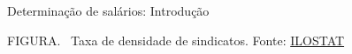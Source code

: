 \documentclass[10pt]{beamer}
\begin{document}
\begin{frame}{Determinação de salários: Introdução}
    \begin{center}
		\begin{minipage}[b]{.55\textwidth}
			\tiny{{\scshape FIGURA}. \ Taxa de densidade de sindicatos. Fonte: \href{https://ilostat.ilo.org/topics/union-membership/}{ILOSTAT}} 
		\end{minipage}
	\end{center}
\end{frame}
\end{document}
